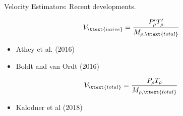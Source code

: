 \documentclass[]{beamer}
\begin{document}









\begin{frame}{Velocity Estimators: Recent developments.}

  \begin{align*}
    V_{\ttext{naive}} = \frac{P'_{\rho}T'_{\rho}}{M_{\rho, \ttext{total}}}  
  \end{align*}
  
  \begin{itemize}
  \item Athey et al. (2016) 
  \item Boldt and van Ordt (2016) 
  \end{itemize}

  \begin{align*}
    V_{\ttext{total}} = \frac{P_{\rho}T_{\rho}}{M_{\rho, \ttext{total}}}
  \end{align*}

  \begin{itemize}
  \item Kalodner et al (2018) 
  \end{itemize}
  
\end{frame}

\end{document}
